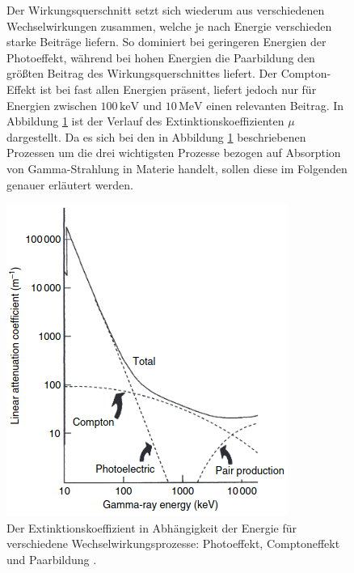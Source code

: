 \FloatBarrier
\begin{figure}[h]
\begin{minipage}[t]{0.48\textwidth}
\vspace{0pt}
Der Wirkungsquerschnitt setzt sich wiederum aus verschiedenen Wechselwirkungen zusammen, welche je nach Energie verschieden starke Beiträge liefern.
So dominiert bei geringeren Energien der Photoeffekt, während bei hohen Energien die Paarbildung den größten Beitrag des Wirkungsquerschnittes liefert.
Der Compton-Effekt ist bei fast allen Energien präsent, liefert jedoch nur für Energien zwischen $100\, \si{\keV}$ und $10\,\si{\MeV}$ einen relevanten Beitrag.
In Abbildung \ref{fig:tfig1} ist der Verlauf des Extinktionskoeffizienten $\mu$ dargestellt.
Da es sich bei den in Abbildung \ref{fig:tfig1} beschriebenen Prozessen um die drei wichtigsten Prozesse bezogen auf Absorption von Gamma-Strahlung in Materie handelt, sollen diese im Folgenden genauer erläutert werden.
\end{minipage}
\hfill
\begin{minipage}[t]{0.50\textwidth}
\vspace{-10pt}
\centering
\includegraphics[width=\textwidth]{Absorption.png}
\caption{Der Extinktionskoeffizient in Abhängigkeit der Energie für verschiedene Wechselwirkungsprozesse: Photoeffekt, Comptoneffekt und Paarbildung \cite{quelle02}.}
\label{fig:tfig1}
\end{minipage}
\end{figure}
\FloatBarrier

